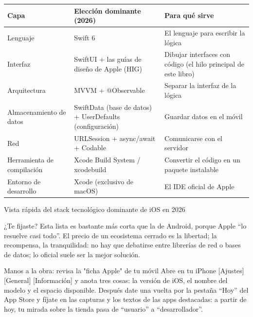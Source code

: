 
\begin{center}
\begin{tabularx}{\linewidth}{|X|X|X|}
\hline
\textbf{Capa} & \textbf{Elección dominante (2026)} & \textbf{Para qué sirve} \tabularnewline
\hline
Lenguaje & Swift 6 & El lenguaje para escribir la lógica \tabularnewline
Interfaz & SwiftUI + las guías de diseño de Apple (HIG) & Dibujar interfaces con código (el hilo principal de este libro) \tabularnewline
Arquitectura & MVVM + @Observable & Separar la interfaz de la lógica \tabularnewline
Almacenamiento de datos & SwiftData (base de datos) + UserDefaults (configuración) & Guardar datos en el móvil \tabularnewline
Red & URLSession + async/await + Codable & Comunicarse con el servidor \tabularnewline
Herramienta de compilación & Xcode Build System / xcodebuild & Convertir el código en un paquete instalable \tabularnewline
Entorno de desarrollo & Xcode (exclusivo de macOS) & El IDE oficial de Apple \tabularnewline
\hline
\end{tabularx}
\end{center}

\begin{center}\small\color{gray}Vista rápida del stack tecnológico dominante de iOS en 2026\end{center}

¿Te fijaste? Esta lista es bastante más corta que la de Android, porque Apple “lo resuelve casi todo”. El precio de un ecosistema cerrado es la libertad; la recompensa, la tranquilidad: no hay que debatirse entre librerías de red o bases de datos; lo oficial suele ser la mejor solución.

\begin{tcbpractice}{Manos a la obra: revisa la "ficha Apple" de tu móvil}
Abre en tu iPhone [Ajustes] [General] [Información] y anota tres cosas: la versión de iOS, el nombre del modelo y el espacio disponible. Después date una vuelta por la pestaña “Hoy” del App Store y fíjate en las capturas y los textos de las apps destacadas: a partir de hoy, tu mirada sobre la tienda pasa de “usuario” a “desarrollador”.

\end{tcbpractice}

